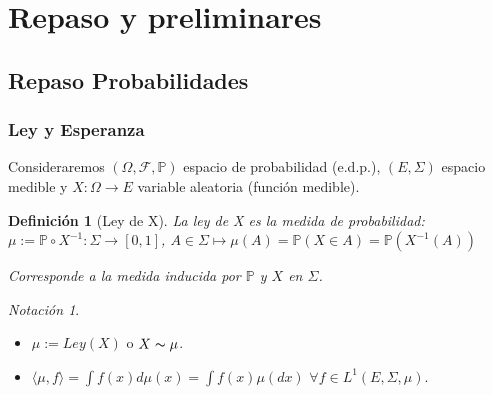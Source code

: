 \documentclass[letterpaper,11pt]{article} %
\theoremstyle{defbreak}
\newtheorem{definition}{Definición}[subsection]
\theoremstyle{propbreak}
\theoremstyle{remark}
\newtheorem*{notation}{Notación}
\theoremstyle{break}
\def\beforeitemize{\leavevmode \vspace{-0.5\baselineskip}}
\begin{document}
	






\section{Repaso y preliminares}
\subsection{Repaso Probabilidades}
\subsubsection{Ley y Esperanza}
Consideraremos $(\Omega,\mathcal{F},\mathbb{P})$ espacio de probabilidad (e.d.p.), $(E,\Sigma)$ espacio medible y $X: \Omega \longrightarrow E$ variable aleatoria (función medible).

\begin{definition}[Ley de X]
La ley de X es la medida de probabilidad:
$\mu := \mathbb{P} \circ X^{-1}: \Sigma \longrightarrow [0,1]$, $A \in \Sigma \longmapsto \mu(A)=\mathbb{P}(X \in A)=\mathbb{P}(X^{-1}(A))$

Corresponde a la medida inducida por $\mathbb{P}$ y $X$ en $\Sigma$.
\end{definition}

\begin{notation}
\beforeitemize
\begin{itemize}
    \item $\mu:=Ley(X)$ o $X\thicksim \mu$.
    \item $\langle \mu, f \rangle = \int f(x) d\mu(x) = \int f(x)\mu(dx)$ $\forall f \in L^1(E,\Sigma,\mu)$.
\end{itemize}
\end{notation}
\end{document}
